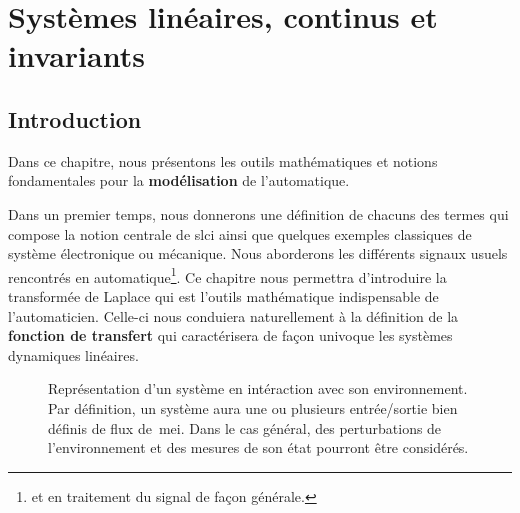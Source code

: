 \chapter[Systèmes linéaires, continus\ldots]
        {Systèmes linéaires, continus et invariants \label{chap-slci}}
\adjustmtc
\minitoc
\newpage
\section{Introduction}
Dans ce chapitre, nous présentons les outils mathématiques 
et notions fondamentales pour la \textbf{modélisation} de l'automatique.

Dans un premier temps, nous donnerons une définition de chacuns 
des termes qui compose la notion centrale de \gls{slci} ainsi que quelques
exemples classiques de système électronique ou mécanique.
Nous aborderons les différents signaux usuels rencontrés
en automatique\footnote{et en traitement du signal de façon générale.}.
Ce chapitre nous permettra d'introduire la transformée de Laplace qui 
est l'outils mathématique indispensable de l'automaticien.
Celle-ci nous conduiera naturellement à la définition 
de la \textbf{fonction de transfert} qui caractérisera de façon univoque 
les systèmes dynamiques linéaires.

\begin{figure}[!h]
\begin{center}
    
\end{center}
\caption{Représentation d'un système en intéraction avec son environnement. 
         Par définition, un système aura une ou plusieurs entrée/sortie bien 
	 définis de flux de~\gls{mei}. Dans le cas général, des perturbations 
	 de l'environnement et des mesures de son état pourront être considérés.
	 \label{fig-systeme}}
\end{figure}
\newpage

